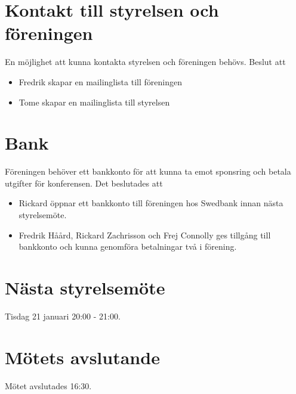 \documentclass[11pt, a4paper]{article}
\begin{document}
\section{Kontakt till styrelsen och föreningen}
En möjlighet att kunna kontakta styrelsen och föreningen behövs. Beslut att

\begin{itemize}
    \item Fredrik skapar en mailinglista till föreningen
    \item Tome skapar en mailinglista till styrelsen
\end{itemize}

\section{Bank}
Föreningen behöver ett bankkonto för att kunna ta emot sponsring och betala
utgifter för konferensen. Det beslutades att
\begin{itemize}
    \item Rickard öppnar ett bankkonto till föreningen hos Swedbank innan nästa
          styrelsemöte.
    \item Fredrik Håård, Rickard Zachrisson och Frej Connolly ges tillgång till
          bankkonto och kunna genomföra betalningar två i förening.
\end{itemize}

\section{Nästa styrelsemöte}
Tisdag 21 januari 20:00 - 21:00.

\section{Mötets avslutande}
Mötet avslutades 16:30.
\end{document}
